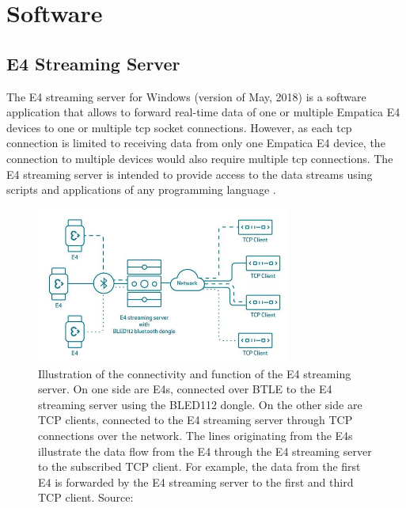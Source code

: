 \newpage
\section{Software}
\subsection{E4 Streaming Server}
The E4 streaming server for Windows (version of May, 2018) is a software application that allows to forward real-time data of one or multiple Empatica E4 devices to one or multiple \gls{tcp} socket connections. However, as each \gls{tcp} connection is limited to receiving data from only one Empatica E4 device, the connection to multiple devices would also require multiple \gls{tcp} connections. The E4 streaming server is intended to provide access to the data streams using scripts and applications of any programming language \cite{E4SS}.

\begin{figure}[h!]
	\centering
  \includegraphics[width=0.75\textwidth]{images/E4streamingServer.JPG}
	\caption[E4 streaming server: connectivity and function]{Illustration of the connectivity and function of the E4 streaming server. On one side are E4s, connected over BTLE to the E4 streaming server using the BLED112 dongle. On the other side are TCP clients, connected to the E4 streaming server through TCP connections over the network. The lines originating from the E4s illustrate the data flow from the E4 through the E4 streaming server to the subscribed TCP client. For example, the data from the first E4 is forwarded by the E4 streaming server to the first and third TCP client. Source: \cite{E4SS}}
	\label{e4ss}
\end{figure}

\newpage
